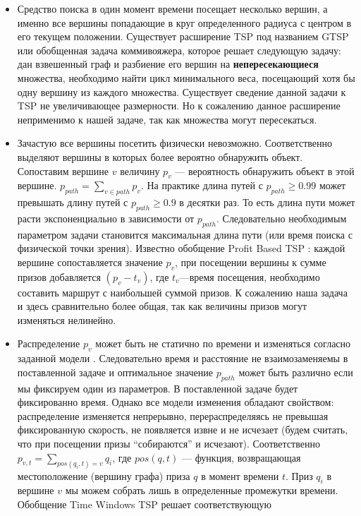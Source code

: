 \begin{itemize}
\item{Средство поиска в один момент времени посещает несколько вершин, а именно все вершины
попадающие в круг определенного радиуса с центром в его текущем положении.
Существует расширение TSP под названием GTSP \cite{ben03} или обобщенная задача коммивояжера,
которое решает следующую задачу:
дан взвешенный граф и разбиение его вершин на \textbf{непересекающиеся} множества, необходимо
найти цикл минимального веса, посещающий хотя бы одну вершину из каждого множества.
Существует сведение данной задачи к TSP не увеличивающее размерности.
Но к сожалению данное расширение неприменимо к нашей задаче, так как множества могут пересекаться.}
\item{Зачастую все вершины посетить физически невозможно. 
Соответственно выделяют вершины в которых более вероятно обнаружить объект.
 Сопоставим вершине $v$ величину $p_v$ --- вероятность обнаружить объект в этой вершине.
 $p_{path}=\sum\limits_{v\in path}p_v$. На практике длина путей с $p_{path} \ge 0.99$ может превышать
длину путей с $p_{path} \ge 0.9$ в десятки раз. То есть длина пути может расти экспоненциально
в зависимости от $p_{path}$. Следовательно необходимым параметром задачи становится максимальная длина
пути (или время поиска с физической точки зрения). Известно обобщение Profit Based TSP \cite{dew13}:
каждой вершине сопоставляется значение $p_v$, при посещении вершины к сумме призов 
добавляется $(p_v-t_v)$, где $t_v$---время посещения, необходимо составить маршрут с
наибольшей суммой призов. К сожалению наша задача и здесь сравнительно более общая, так как
величины призов могут изменяться нелинейно.}
\item{Распределение $p_v$ может быть не статично по времени и изменяться согласно
заданной модели \cite{li06}. Следовательно время и расстояние не взаимозаменяемы в поставленной
задаче и
оптимальное значение $p_{path}$ может быть различно если мы фиксируем один из параметров.
В поставленной задаче будет фиксированно время. Однако все модели изменения обладают свойством:
распределение изменяется непрерывно, перераспределяясь не превышая фиксированную скорость,
не появляется извне и не исчезает (будем считать, что при посещении призы ``собираются'' и исчезают).
Соответственно $p_{v,t}=\sum_{pos(q_i,t)=v}q_i$, где $pos(q,t)$ --- функция, возвращающая местоположение
(вершину графа) приза $q$ в момент времени $t$. Приз $q_i$ в вершине $v$ мы можем собрать лишь в 
определенные промежутки времени. Обобщение Time Windows TSP \cite{lop13} решает соответствующую
}
\end{itemize}
